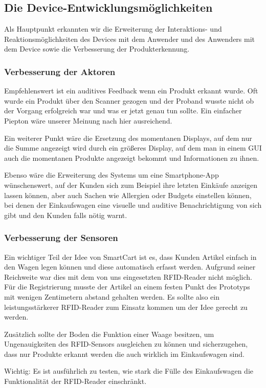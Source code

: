 \documentclass{sigchi}
\begin{document}
\subsection{Die Device-Entwicklungsmöglichkeiten}
Als Hauptpunkt erkannten wir die Erweiterung der Interaktions- und Reaktionsmöglichkeiten des Devices mit dem Anwender und des Anwenders mit dem Device sowie die Verbesserung der Produkterkennung.

\subsubsection{Verbesserung der Aktoren}
Empfehlenswert ist ein auditives Feedback wenn ein Produkt erkannt wurde. Oft wurde ein Produkt über den Scanner gezogen und der Proband wusste nicht ob der Vorgang erfolgreich war und was er jetzt genau tun sollte. Ein einfacher Piepton wäre unserer Meinung nach hier ausreichend.

Ein weiterer Punkt wäre die Ersetzung des momentanen Displays, auf dem nur die Summe angezeigt wird durch ein größeres Display, auf dem man in einem GUI auch die momentanen Produkte angezeigt bekommt und Informationen zu ihnen.

Ebenso wäre die Erweiterung des Systems um eine Smartphone-App wünschenswert, auf der Kunden sich zum Beispiel ihre letzten Einkäufe anzeigen lassen können, aber auch Sachen wie Allergien oder Budgets einstellen können, bei denen der Einkaufswagen eine visuelle und auditive Benachrichtigung von sich gibt und den Kunden falls nötig warnt. 

\subsubsection{Verbesserung der Sensoren}
Ein wichtiger Teil der Idee von SmartCart ist es, dass Kunden Artikel einfach in den Wagen legen können und diese automatisch erfasst werden. Aufgrund seiner Reichweite war dies mit dem von uns eingesetzten RFID-Reader nicht möglich. Für die Registrierung musste der Artikel an einem festen Punkt des Prototyps mit wenigen Zentimetern abstand gehalten werden. Es sollte also ein leistungsstärkerer RFID-Reader zum Einsatz kommen um der Idee gerecht zu werden.

Zusätzlich sollte der Boden die Funktion einer Waage besitzen, um Ungenauigkeiten des RFID-Sensors ausgleichen zu können und sicherzugehen, dass nur Produkte erkannt werden die auch wirklich im Einkaufswagen sind. 

Wichtig: Es ist ausführlich zu testen, wie stark die Fülle des Einkaufswagen die Funktionalität der RFID-Reader einschränkt.  
\end{document}
